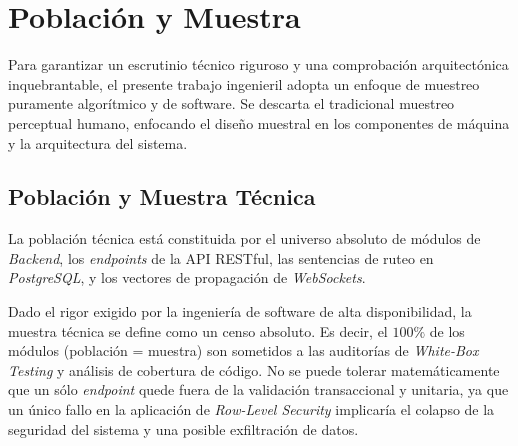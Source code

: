 \section{Poblaci\'on y Muestra}

Para garantizar un escrutinio t\'ecnico riguroso y una comprobaci\'on arquitect\'onica inquebrantable, el presente trabajo ingenieril adopta un enfoque de muestreo puramente algor\'itmico y de software. Se descarta el tradicional muestreo perceptual humano, enfocando el dise\~no muestral en los componentes de m\'aquina y la arquitectura del sistema.

\subsection{Poblaci\'on y Muestra T\'ecnica}

La poblaci\'on t\'ecnica est\'a constituida por el universo absoluto de m\'odulos de \textit{Backend}, los \textit{endpoints} de la API RESTful, las sentencias de ruteo en \textit{PostgreSQL}, y los vectores de propagaci\'on de \textit{WebSockets}. 

Dado el rigor exigido por la ingenier\'ia de software de alta disponibilidad, la muestra t\'ecnica se define como un censo absoluto. Es decir, el $100\%$ de los m\'odulos (poblaci\'on = muestra) son sometidos a las auditor\'ias de \textit{White-Box Testing} y an\'alisis de cobertura de c\'odigo. No se puede tolerar matem\'aticamente que un s\'olo \textit{endpoint} quede fuera de la validaci\'on transaccional y unitaria, ya que un \'unico fallo en la aplicaci\'on de \textit{Row-Level Security} implicar\'ia el colapso de la seguridad del sistema y una posible exfiltraci\'on de datos.
